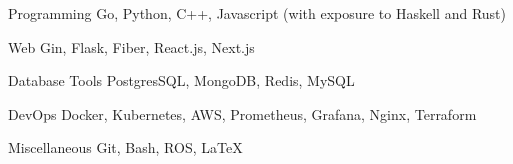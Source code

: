 \begin{cvskills}

  \cvskill
  {Programming}
  {Go, Python, C++, Javascript (with exposure to Haskell and Rust)}
  
  \cvskill
  {Web}
  {Gin, Flask, Fiber, React.js, Next.js}

  \cvskill
  {Database Tools}
  {PostgresSQL, MongoDB, Redis, MySQL}

  \cvskill
  {DevOps}
  {Docker, Kubernetes, AWS, Prometheus, Grafana, Nginx, Terraform}

  \cvskill
  {Miscellaneous}
  {Git, Bash, ROS, \LaTeX}

\end{cvskills}
